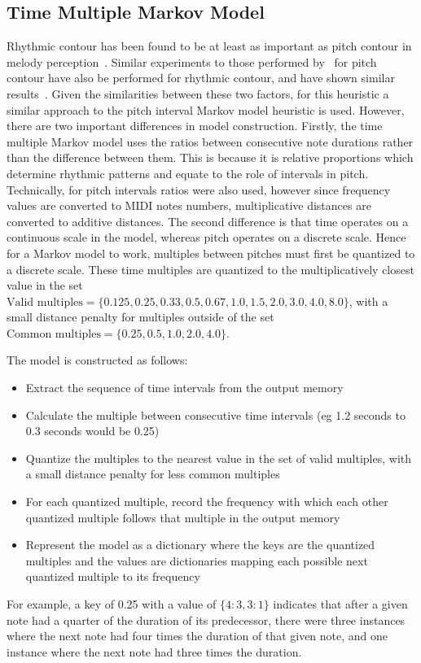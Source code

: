 \subsection{Time Multiple Markov Model}

Rhythmic contour has been found to be at least as important as pitch contour in melody perception~\citep{Dowling1999RhythmContour}. Similar experiments to those performed by~\cite{Dowling1971Contour} for pitch contour have also be performed for rhythmic contour, and have shown similar results~\citep{Schmuckler2023RhythmContour}. Given the similarities between these two factors, for this heuristic a similar approach to the pitch interval Markov model heuristic is used. However, there are two important differences in model construction. Firstly, the time multiple Markov model uses the ratios between consecutive note durations rather than the difference between them. This is because it is relative proportions which determine rhythmic patterns and equate to the role of intervals in pitch. Technically, for pitch intervals ratios were also used, however since frequency values are converted to MIDI notes numbers, multiplicative distances are converted to additive distances. The second difference is that time operates on a continuous scale in the model, whereas pitch operates on a discrete scale. Hence for a Markov model to work, multiples between pitches must first be quantized to a discrete scale. These time multiples are quantized to the multiplicatively closest value in the set $\text{Valid multiples} = \{0.125, 0.25, 0.33, 0.5, 0.67, 1.0, 1.5, 2.0, 3.0, 4.0, 8.0\}$, with a small distance penalty for multiples outside of the set $\text{Common multiples} = \{0.25, 0.5, 1.0, 2.0, 4.0\}$.

The model is constructed as follows:
\begin{itemize}
    \item Extract the sequence of time intervals from the output memory
    \item Calculate the multiple between consecutive time intervals (eg 1.2 seconds to 0.3 seconds would be 0.25)
    \item Quantize the multiples to the nearest value in the set of valid multiples, with a small distance penalty for less common multiples
    \item For each quantized multiple, record the frequency with which each other quantized multiple follows that multiple in the output memory
    \item Represent the model as a dictionary where the keys are the quantized multiples and the values are dictionaries mapping each possible next quantized multiple to its frequency 
\end{itemize}
For example, a key of 0.25 with a value of $\{4: 3, 3: 1\}$ indicates that after a given note had a quarter of the duration of its predecessor, there were three instances where the next note had four times the duration of that given note, and one instance where the next note had three times the duration.

